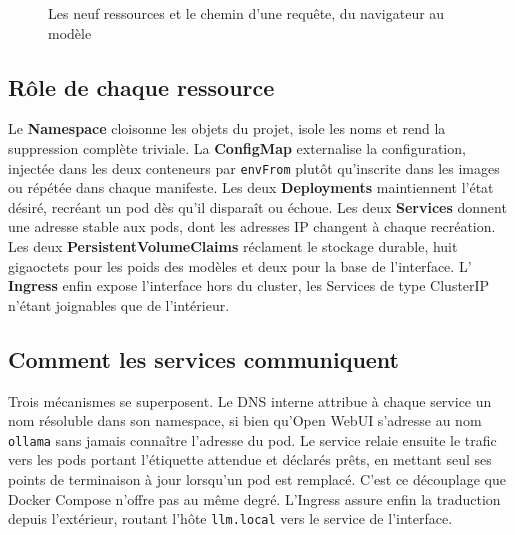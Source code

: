 \documentclass[10pt,a4paper]{article}
\begin{document}
\begin{figure}[h]
\caption{Les neuf ressources et le chemin d'une requête, du navigateur au modèle}
\end{figure}

\vspace{-3pt}

\subsection{Rôle de chaque ressource}

Le \textbf{Namespace} cloisonne les objets du projet, isole les noms et rend la
suppression complète triviale. La \textbf{ConfigMap} externalise la
configuration, injectée dans les deux conteneurs par \texttt{envFrom} plutôt
qu'inscrite dans les images ou répétée dans chaque manifeste. Les deux
\textbf{Deployments} maintiennent l'état désiré, recréant un pod dès qu'il
disparaît ou échoue. Les deux \textbf{Services} donnent une adresse stable aux
pods, dont les adresses IP changent à chaque recréation. Les deux
\textbf{PersistentVolumeClaims} réclament le stockage durable, huit gigaoctets
pour les poids des modèles et deux pour la base de l'interface. L'
\textbf{Ingress} enfin expose l'interface hors du cluster, les Services de
type ClusterIP n'étant joignables que de l'intérieur.

\subsection{Comment les services communiquent}

Trois mécanismes se superposent. Le DNS interne attribue à chaque service un nom
résoluble dans son namespace, si bien qu'Open WebUI s'adresse au nom
\texttt{ollama} sans jamais connaître l'adresse du pod. Le service relaie
ensuite le trafic vers les pods portant l'étiquette attendue et déclarés
prêts, en mettant seul ses points de terminaison à jour lorsqu'un pod est
remplacé. C'est ce découplage que Docker Compose n'offre pas au même degré.
L'Ingress assure enfin la traduction depuis l'extérieur, routant l'hôte
\texttt{llm.local} vers le service de l'interface.
\end{document}
